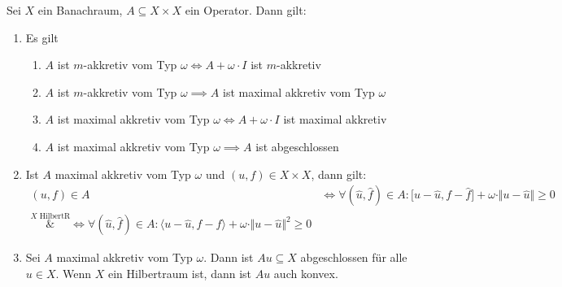\begin{lemma}
	Sei $X$ ein Banachraum, $A\subseteq X\times X$ ein Operator. 
	Dann gilt:
	\begin{enumerate}[label=(\alph*)]
		\item Es gilt %
		\begin{enumerate}[label=(\roman*)]
			\item $A$ ist $m$-akkretiv vom Typ $\omega\Longleftrightarrow A+\omega\cdot I$ ist $m$-akkretiv
			\item $A$ ist $m$-akkretiv vom Typ $\omega\implies A$ ist maximal akkretiv vom Typ $\omega$
			\item $A$ ist maximal akkretiv vom Typ $\omega\Longleftrightarrow A+\omega\cdot I$ ist maximal akkretiv
			\item $A$ ist maximal akkretiv vom Typ $\omega\implies A$ ist abgeschlossen
		\end{enumerate}
 		\item Ist $A$ maximal akkretiv vom Typ $\omega$ und $(u,f)\in X\times X$, dann gilt:
 		\begin{align*}
 			(u,f)\in A&\Longleftrightarrow\forall(\hat{u},\hat{f})\in A:\big[u-\hat{u},f-\hat{f}\big]+\omega\cdot\Vert u-\hat{u}\Vert\geq0\\
 			\overset{X\text{ HilbertR}}&{\Longleftrightarrow}
 			\forall(\hat{u},\hat{f})\in A:\big\langle u-\hat{u},f-\hat{f}\big\rangle+\omega\cdot\Vert u-\hat{u}\Vert^2\geq0
 		\end{align*}
 		\item Sei $A$ maximal akkretiv vom Typ $\omega$. 
 		Dann ist $Au\subseteq X$ abgeschlossen für alle $u\in X$. 
 		Wenn $X$ ein Hilbertraum ist, dann ist $Au$ auch konvex.
	\end{enumerate}
\end{lemma}

